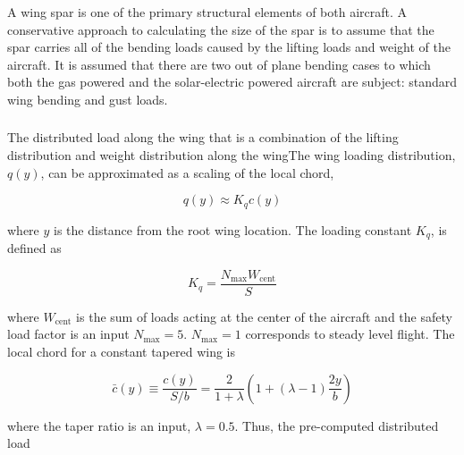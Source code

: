A wing spar is one of the primary structural elements of both aircraft. 
A conservative approach to calculating the size of the spar is to assume that the spar carries all of the bending loads caused by the lifting loads and weight of the aircraft.  
It is assumed that there are two out of plane bending cases to which both the gas powered and the solar-electric powered aircraft are subject: standard wing bending and gust loads. 

\DIFdelbegin \subsubsection{}
\addtocounter{subsubsection}{-1}%
\DIFdelend %

\DIFaddbegin \paragraph{\textbf{}} 
\DIFaddend The distributed load along the wing that is a combination of the lifting distribution and weight distribution along the wing\DIFaddbegin {}\DIFaddend The wing loading distribution, $q(y)$, can be approximated as a scaling of the local chord,\cite{bending}

\begin{equation}
    \label{e:wingloading}
    q(y) \approx K_q c(y) 
\end{equation}

where $y$ is the distance from the root wing location. The loading constant $K_q$\cite{bending}, is defined as

\begin{equation}
    \label{e:kq}
    K_q = \frac{N_{\text{max}}W_{\text{cent}}}{S}
\end{equation}

where $W_{\text{cent}}$ is the sum of loads acting at the center of the aircraft and the safety load factor is an input $N_{\text{max}}=5$.  $N_{\text{max}}=1$ corresponds to steady level flight. The local chord for a constant tapered wing\cite{bending} is 

\begin{equation}
    \label{e:localchord}
    \bar{c}(y) \equiv \frac{c(y)}{S/b} = \frac{2}{1+\lambda} \left( 1 + (\lambda - 1) \frac{2y}{b} \right)
\end{equation}

where the taper ratio is an input, $\lambda=0.5$.  Thus, the pre-computed distributed load 

